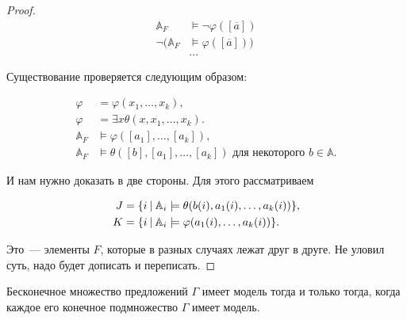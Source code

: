 \begin{proof}
    \begin{equation*}
        \begin{aligned}
            \mathbb{A}_F &\models \neg \varphi([\overline{a}]) \\ 
            \neg (\mathbb{A}_F &\models \varphi([\overline{a}])) \\ 
            & \ldots
        \end{aligned}
    \end{equation*} 

    Существование проверяется следующим образом: 

    \begin{equation*}
        \begin{aligned}
            \varphi &= \varphi(x_1, \ldots, x_k), \\ 
            \varphi &= \exists x \theta (x, x_1, \ldots, x_k). \\ 
            \mathbb{A}_F &\models \varphi([a_1], \ldots, [a_k]), \\ 
            \mathbb{A}_F &\models \theta([b], [a_1], \ldots, [a_k]) \text{ для некоторого } b \in \mathbb{A}.  
        \end{aligned}
    \end{equation*} 

    И нам нужно доказать в две стороны. Для этого рассматриваем  

    \begin{equation*}
        \begin{aligned}
            J &= \set*{i\:\middle\vert\: \mathbb{A}_i \models \theta(b(i), a_1(i), \ldots, a_k(i))}, \\ 
            K &= \set*{i\:\middle\vert\: \mathbb{A}_i \models \varphi(a_1(i), \ldots, a_k(i))}.
        \end{aligned}
    \end{equation*} 

    Это~— элементы $F$, которые в разных случаях лежат друг в друге. Не уловил суть, надо будет дописать и переписать.
\end{proof} 

\begin{theorem}
    Бесконечное множество предложений $\Gamma$ имеет модель тогда и только тогда, когда каждое его конечное подмножество $\Gamma$ имеет модель.
\end{theorem}  

